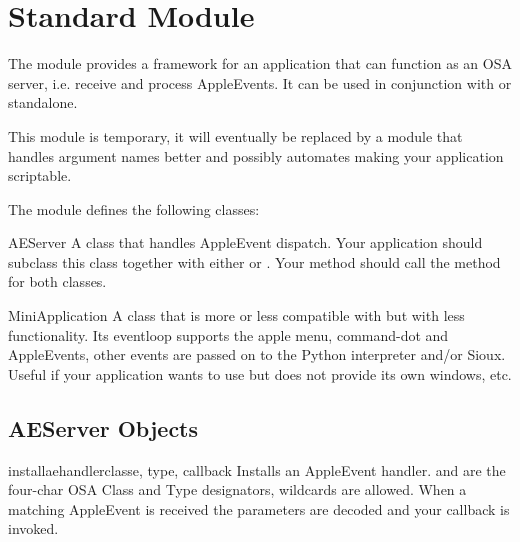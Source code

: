 \section{Standard Module }
\label{module-MiniAEFrame}

The module  provides a framework for an application
that can function as an OSA server, i.e. receive and process
AppleEvents. It can be used in conjunction with  or
standalone.

This module is temporary, it will eventually be replaced by a module
that handles argument names better and possibly automates making your
application scriptable.

The  module defines the following classes:


\begin{funcdesc}{AEServer}{}
A class that handles AppleEvent dispatch. Your application should
subclass this class together with either
 or
. Your  method should call
the  method for both classes.
\end{funcdesc}

\begin{funcdesc}{MiniApplication}{}
A class that is more or less compatible with
 but with less functionality. Its
eventloop supports the apple menu, command-dot and AppleEvents, other
events are passed on to the Python interpreter and/or Sioux.
Useful if your application wants to use  but does not
provide its own windows, etc.
\end{funcdesc}

\subsection{AEServer Objects}


\begin{funcdesc}{installaehandler}{classe, type, callback}
Installs an AppleEvent handler.  and  are the
four-char OSA Class and Type designators,  wildcards are
allowed. When a matching AppleEvent is received the parameters are
decoded and your callback is invoked.
\end{funcdesc}

